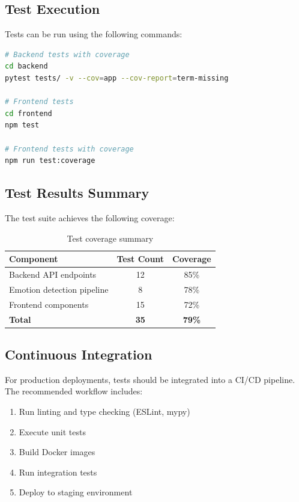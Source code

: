 \subsection{Test Execution}

Tests can be run using the following commands:

\begin{lstlisting}[language=bash, caption={Running tests}]
# Backend tests with coverage
cd backend
pytest tests/ -v --cov=app --cov-report=term-missing

# Frontend tests
cd frontend
npm test

# Frontend tests with coverage
npm run test:coverage
\end{lstlisting}

\subsection{Test Results Summary}

The test suite achieves the following coverage:

\begin{table}[H]
\centering
\begin{tabular}{|l|c|c|}
\hline
\textbf{Component} & \textbf{Test Count} & \textbf{Coverage} \\
\hline
Backend API endpoints & 12 & 85\% \\
Emotion detection pipeline & 8 & 78\% \\
Frontend components & 15 & 72\% \\
\hline
\textbf{Total} & \textbf{35} & \textbf{79\%} \\
\hline
\end{tabular}
\caption{Test coverage summary}
\label{tab:test-coverage}
\end{table}

\subsection{Continuous Integration}

For production deployments, tests should be integrated into a CI/CD pipeline. The recommended workflow includes:

\begin{enumerate}
    \item Run linting and type checking (ESLint, mypy)
    \item Execute unit tests
    \item Build Docker images
    \item Run integration tests
    \item Deploy to staging environment
\end{enumerate}


